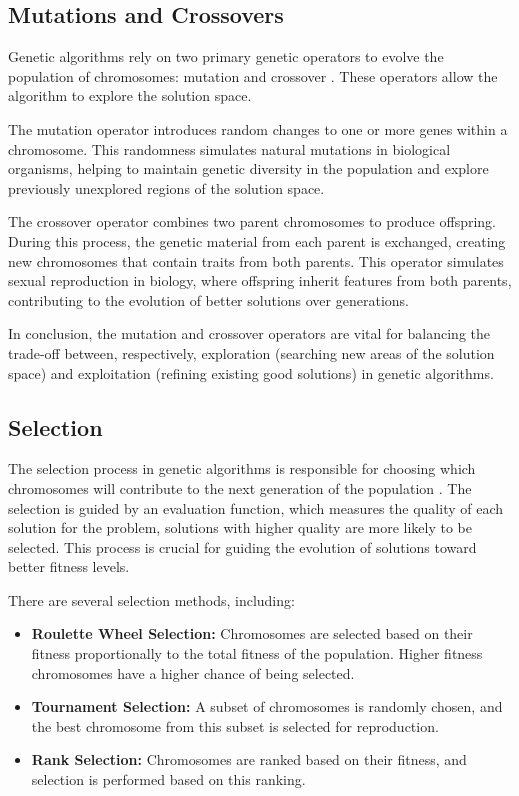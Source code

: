     \subsection{Mutations and Crossovers}
    
        Genetic algorithms rely on two primary genetic operators to evolve the population of chromosomes: mutation and crossover \cite{holland1992adaptation}. 
        These operators allow the algorithm to explore the solution space.
        
        The mutation operator introduces random changes to one or more genes within a chromosome. This randomness simulates natural mutations in biological organisms, helping to maintain genetic diversity in the population and explore previously unexplored regions of the solution space.
        
        The crossover operator combines two parent chromosomes to produce offspring. During this process, the genetic material from each parent is exchanged, creating new chromosomes that contain traits from both parents. This operator simulates sexual reproduction in biology, where offspring inherit features from both parents, contributing to the evolution of better solutions over generations.

        In conclusion, the mutation and crossover operators are vital for balancing the trade-off between, respectively, exploration (searching new areas of the solution space) and exploitation (refining existing good solutions) in genetic algorithms.

    \subsection{Selection}
        The selection process in genetic algorithms is responsible for choosing which chromosomes will contribute to the next generation of the population \cite{holland1992adaptation}. 
        The selection is guided by an evaluation function, which measures the quality of each solution for the problem, solutions with higher quality are more likely to be selected.
        This process is crucial for guiding the evolution of solutions toward better fitness levels.
        
        There are several selection methods, including:
        \begin{itemize}
            \item \textbf{Roulette Wheel Selection:} Chromosomes are selected based on their fitness proportionally to the total fitness of the population. Higher fitness chromosomes have a higher chance of being selected.
            \item \textbf{Tournament Selection:} A subset of chromosomes is randomly chosen, and the best chromosome from this subset is selected for reproduction.
            \item \textbf{Rank Selection:} Chromosomes are ranked based on their fitness, and selection is performed based on this ranking.
        \end{itemize}
        
